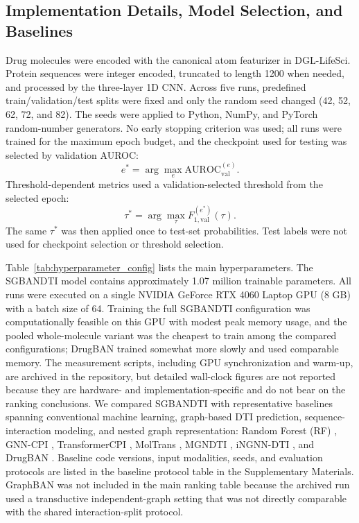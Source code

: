 \documentclass[computers,article,submit,moreauthors]{Definitions/mdpi}
\begin{document}
\subsection{Implementation Details, Model Selection, and Baselines}
Drug molecules were encoded with the canonical atom featurizer in DGL-LifeSci. Protein sequences were integer encoded, truncated to length 1200 when needed, and processed by the three-layer 1D CNN. Across five runs, predefined train/validation/test splits were fixed and only the random seed changed (42, 52, 62, 72, and 82). The seeds were applied to Python, NumPy, and PyTorch random-number generators. No early stopping criterion was used; all runs were trained for the maximum epoch budget, and the checkpoint used for testing was selected by validation AUROC:
\begin{equation}
e^* = \arg\max_e \mathrm{AUROC}_{\mathrm{val}}^{(e)}.
\end{equation}
Threshold-dependent metrics used a validation-selected threshold from the selected epoch:
\begin{equation}
\tau^* = \arg\max_\tau F_{1,\mathrm{val}}^{(e^*)}(\tau).
\end{equation}
The same $\tau^*$ was then applied once to test-set probabilities. Test labels were not used for checkpoint selection or threshold selection.

Table~\ref{tab:hyperparameter_config} lists the main hyperparameters. The SGBANDTI model contains approximately 1.07 million trainable parameters. All runs were executed on a single NVIDIA GeForce RTX 4060 Laptop GPU (8 GB) with a batch size of 64. Training the full SGBANDTI configuration was computationally feasible on this GPU with modest peak memory usage, and the pooled whole-molecule variant was the cheapest to train among the compared configurations; DrugBAN trained somewhat more slowly and used comparable memory. The measurement scripts, including GPU synchronization and warm-up, are archived in the repository, but detailed wall-clock figures are not reported because they are hardware- and implementation-specific and do not bear on the ranking conclusions. We compared SGBANDTI with representative baselines spanning conventional machine learning, graph-based DTI prediction, sequence-interaction modeling, and nested graph representation: Random Forest (RF) \citep{breiman2001}, GNN-CPI \citep{tsubaki2019}, TransformerCPI \citep{chen2020}, MolTrans \citep{huang2021moltrans}, MGNDTI \citep{peng2024}, iNGNN-DTI \citep{sun2024ingnndti}, and DrugBAN \citep{bai2023drugban}. Baseline code versions, input modalities, seeds, and evaluation protocols are listed in the baseline protocol table in the Supplementary Materials. GraphBAN was not included in the main ranking table because the archived run used a transductive independent-graph setting that was not directly comparable with the shared interaction-split protocol.
\end{document}

